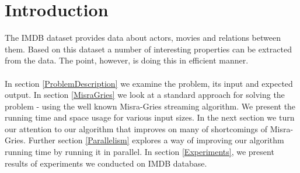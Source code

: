 \label{Introduction}
\section{Introduction}

The IMDB dataset provides data about actors, movies and relations between them. Based on this dataset a number of interesting properties can be extracted from the data. The point, however, is doing this in efficient manner.
\\
\\
In section \ref{ProblemDescription} we examine the problem, its input and expected output. In section \ref{MisraGries} we look at a standard approach for solving the problem - using the well known Misra-Gries streaming algorithm. We present the running time and space usage for various input sizes. In the next section we turn our attention to our algorithm that improves on many of shortcomings of Misra-Gries. Further section \ref{Parallelism} explores a way of improving our algorithm running time by running it in parallel. In section \ref{Experiments}, we present results of experiments we conducted on IMDB database.

